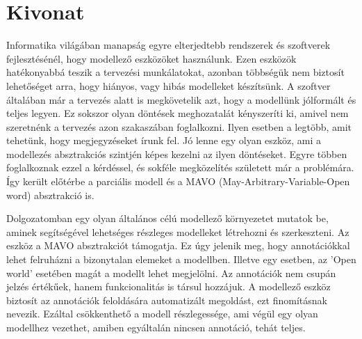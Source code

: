 \setcounter{page}{1}

\selecthungarian

\chapter*{Kivonat}


Informatika világában manapság egyre elterjedtebb rendszerek és szoftverek fejlesztésénél, hogy modellező eszközöket használunk. Ezen eszközök hatékonyabbá teszik a tervezési munkálatokat, azonban többségük nem biztosít lehetőséget arra, hogy hiányos, vagy hibás modelleket készítsünk. A szoftver általában már a tervezés alatt is megkövetelik azt, hogy a modellünk jólformált és teljes legyen. Ez sokszor olyan döntések meghozatalát kényszeríti ki, amivel nem szeretnénk a tervezés azon szakaszában foglalkozni. Ilyen esetben a legtöbb, amit tehetünk, hogy megjegyzéseket írunk fel. Jó lenne egy olyan eszköz, ami a modellezés absztrakciós szintjén képes kezelni az ilyen döntéseket. 
Egyre többen foglalkoznak ezzel a kérdéssel, és sokféle megközelítés született már a problémára. Így került előtérbe a parciális modell és a MAVO (May-Arbitrary-Variable-Open word) absztrakció is. 
\par
Dolgozatomban egy olyan általános célú modellező környezetet mutatok be, aminek segítségével lehetséges részleges modelleket létrehozni és szerkeszteni. Az eszköz a MAVO absztrakciót támogatja. Ez úgy jelenik meg, hogy annotációkkal lehet felruházni a bizonytalan elemeket a modellben. Illetve egy esetben, az 'Open world' esetében magát a modellt lehet megjelölni. Az annotációk nem csupán jelzés értékűek, hanem funkcionalitás is társul hozzájuk. A modellező eszköz biztosít az annotációk feloldására automatizált megoldást, ezt finomításnak nevezik. Ezáltal csökkenthető a modell részlegessége, ami végül egy olyan modellhez vezethet, amiben egyáltalán nincsen annotáció, tehát teljes.


\vfill
\selectenglish



